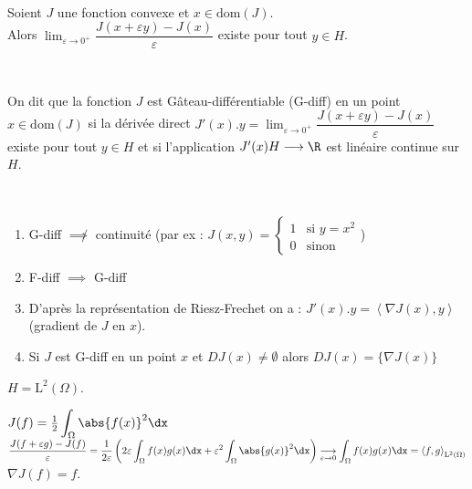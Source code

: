 \documentclass[12pt,a4paper]{article}
\begin{document}
	\begin{prop}
		$ $\\
		
		\begin{minipage}{17cm}
		Soient $J$ une fonction convexe et $x \in \mathrm{dom}(J)$.\\ Alors $\lim_{\varepsilon\to 0^+} \dfrac{J(x+\varepsilon y)-J(x)}\varepsilon$ existe pour tout $y \in H$.
		\end{minipage}
	\end{prop}
	
	\begin{defi}
		$ $
		
		\begin{minipage}{17cm}
			On dit que la fonction $J$ est Gâteau-différentiable (G-diff) en un point $x \in \mathrm{dom}(J)$ si la dérivée direct $J'(x).y = \lim_{\varepsilon\to 0^+}  \dfrac{J(x+\varepsilon y)-J(x)}\varepsilon$ existe pour tout $y \in H$ et si l'application $J'(x)  H \longrightarrow\R$ est linéaire continue sur $H$.
		\end{minipage}
	\end{defi}
	
	\begin{rmq}
		$ $
		
		\begin{minipage}[t]{17cm}
			\begin{enumerate}
				\item G-diff $\not\implies$ continuité (par ex : $J(x,y) = \begin{cases}
					1 & \text{si } y=x^2\\
					0 & \text{sinon}
				\end{cases}$)
				
				\item F-diff $\implies$ G-diff
				
				\item D'après la représentation de Riesz-Frechet on a : $J'(x).y = \left<\nabla J(x),y\right>$ (gradient de $J$ en $x$).
				
				\item Si $J$ est G-diff en un point $x$ et $D J(x) \not=\emptyset$ alors $D J(x) = \{\nabla J(x)\}$
			\end{enumerate}
		\end{minipage}
	\end{rmq}
	
	\begin{ex}
		$H = \mathrm{L}^2(\Omega)$.
		
		\begin{minipage}{17cm}
			$J(f) = \frac12\displaystyle\int_\Omega \abs{f(x)}^2\dx$\\
			$\dfrac{J(f+\varepsilon g)-J(f)}{\varepsilon} =\displaystyle \frac1{2\varepsilon}\left(2\varepsilon\int_\Omega f(x)g(x)\dx +\varepsilon^2\int_\Omega\abs{g(x)}^2\dx\right) \underset{\varepsilon \to 0}\longrightarrow \int_\Omega f(x)g(x)\dx = \left<f,g\right>_{\mathrm{L^2(\Omega)}}$\\
			$\nabla J(f) = f$.\\
			
		\end{minipage}
	\end{ex}
	
\end{document}
